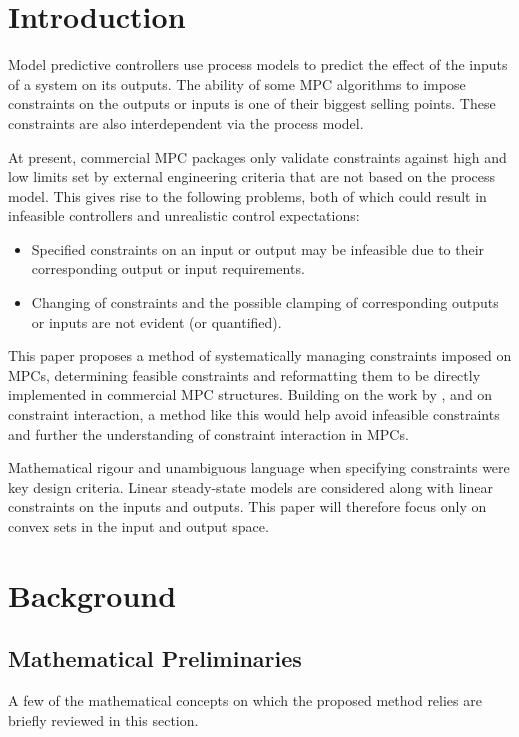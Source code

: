 \documentclass[final,authoryear,5pt,times,twocolumn]{elsarticle}
\begin{document}
\section{Introduction}\label{sec:intro}
Model predictive controllers use process models to predict the effect of the inputs of a system on its outputs.
The ability of some MPC algorithms to impose constraints on the outputs or inputs is one of their biggest selling points.
These constraints are also interdependent via the process model.

At present, commercial MPC packages only validate constraints against high and low limits set by external engineering criteria that are not based on the process model.
This gives rise to the following problems, both of which could result in infeasible controllers and unrealistic control expectations:
\begin{itemize}
  \item Specified constraints on an input or output may be infeasible due to their corresponding output or input requirements.
  \item Changing of constraints and the possible clamping of corresponding outputs or inputs are not evident (or quantified).
\end{itemize}

This paper proposes a method of systematically managing constraints imposed on MPCs, determining feasible constraints and reformatting them to be directly implemented in commercial MPC structures.
Building on the work by \citet{vinsonartoi}, \citet{opconproc} and \citet{limaphd} on constraint interaction, a method like this would help avoid infeasible constraints and further the understanding of constraint interaction in MPCs.

Mathematical rigour and unambiguous language when specifying constraints were key design criteria.
Linear steady-state models are considered along with linear constraints on the inputs and outputs.
This paper will therefore focus only on convex sets in the input and output space.


\section{Background}\label{sec:background}
\subsection{Mathematical Preliminaries}
A few of the mathematical concepts on which the proposed method relies are briefly reviewed in this section.
\end{document}
